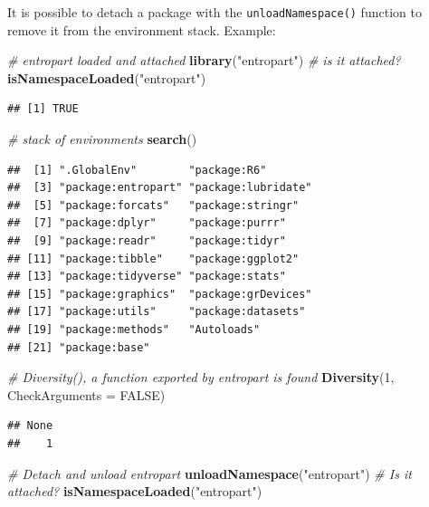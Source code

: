 \documentclass[
  12pt,
  american,
  a4paper,
  extrafontsizes,onecolumn,openright
  ]{memoir}
\newenvironment{Shaded}{\begin{snugshade}}{\end{snugshade}}
\newcommand{\AttributeTok}[1]{\textcolor[rgb]{0.13,0.29,0.53}{#1}}
\newcommand{\CommentTok}[1]{\textcolor[rgb]{0.56,0.35,0.01}{\textit{#1}}}
\newcommand{\ConstantTok}[1]{\textcolor[rgb]{0.56,0.35,0.01}{#1}}
\newcommand{\DecValTok}[1]{\textcolor[rgb]{0.00,0.00,0.81}{#1}}
\newcommand{\FunctionTok}[1]{\textcolor[rgb]{0.13,0.29,0.53}{\textbf{#1}}}
\newcommand{\NormalTok}[1]{#1}
\newcommand{\StringTok}[1]{\textcolor[rgb]{0.31,0.60,0.02}{#1}}
\begin{document}
It is possible to detach a package with the \texttt{unloadNamespace()} function to remove it from the environment stack.
Example:

\scriptsize

\begin{Shaded}
\begin{Highlighting}[]
\CommentTok{\# entropart loaded and attached}
\FunctionTok{library}\NormalTok{(}\StringTok{"entropart"}\NormalTok{)}
\CommentTok{\# is it attached?}
\FunctionTok{isNamespaceLoaded}\NormalTok{(}\StringTok{"entropart"}\NormalTok{)}
\end{Highlighting}
\end{Shaded}

\begin{verbatim}
## [1] TRUE
\end{verbatim}

\begin{Shaded}
\begin{Highlighting}[]
\CommentTok{\# stack of environments}
\FunctionTok{search}\NormalTok{()}
\end{Highlighting}
\end{Shaded}

\begin{verbatim}
##  [1] ".GlobalEnv"        "package:R6"       
##  [3] "package:entropart" "package:lubridate"
##  [5] "package:forcats"   "package:stringr"  
##  [7] "package:dplyr"     "package:purrr"    
##  [9] "package:readr"     "package:tidyr"    
## [11] "package:tibble"    "package:ggplot2"  
## [13] "package:tidyverse" "package:stats"    
## [15] "package:graphics"  "package:grDevices"
## [17] "package:utils"     "package:datasets" 
## [19] "package:methods"   "Autoloads"        
## [21] "package:base"
\end{verbatim}

\begin{Shaded}
\begin{Highlighting}[]
\CommentTok{\# Diversity(), a function exported by entropart is found}
\FunctionTok{Diversity}\NormalTok{(}\DecValTok{1}\NormalTok{, }\AttributeTok{CheckArguments =} \ConstantTok{FALSE}\NormalTok{)}
\end{Highlighting}
\end{Shaded}

\begin{verbatim}
## None 
##    1
\end{verbatim}

\begin{Shaded}
\begin{Highlighting}[]
\CommentTok{\# Detach and unload entropart}
\FunctionTok{unloadNamespace}\NormalTok{(}\StringTok{"entropart"}\NormalTok{)}
\CommentTok{\# Is it attached?}
\FunctionTok{isNamespaceLoaded}\NormalTok{(}\StringTok{"entropart"}\NormalTok{)}
\end{Highlighting}
\end{Shaded}
\end{document}
